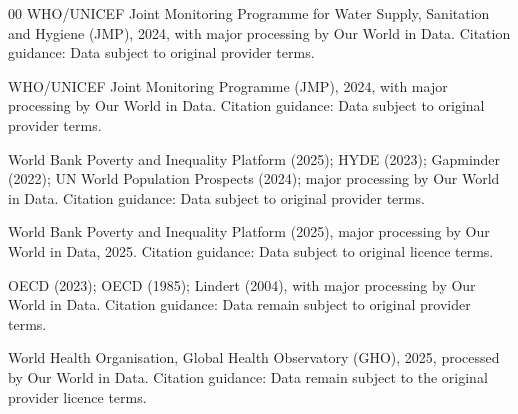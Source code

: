 \documentclass[conference]{IEEEtran}
\begin{document}
\begin{thebibliography}{00}
WHO/UNICEF Joint Monitoring Programme for Water Supply, Sanitation and Hygiene (JMP), 2024, with major processing by Our World in Data. 
Citation guidance: Data subject to original provider terms.

WHO/UNICEF Joint Monitoring Programme (JMP), 2024, with major processing by Our World in Data. 
Citation guidance: Data subject to original provider terms.

World Bank Poverty and Inequality Platform (2025); HYDE (2023); Gapminder (2022); UN World Population Prospects (2024); major processing by Our World in Data. 
Citation guidance: Data subject to original provider terms.

World Bank Poverty and Inequality Platform (2025), major processing by Our World in Data, 2025.
Citation guidance: Data subject to original licence terms.

OECD (2023); OECD (1985); Lindert (2004), with major processing by Our World in Data. 
Citation guidance: Data remain subject to original provider terms.

World Health Organisation, Global Health Observatory (GHO), 2025, processed by Our World in Data. 
Citation guidance: Data remain subject to the original provider licence terms.

\end{thebibliography}
\end{document}
